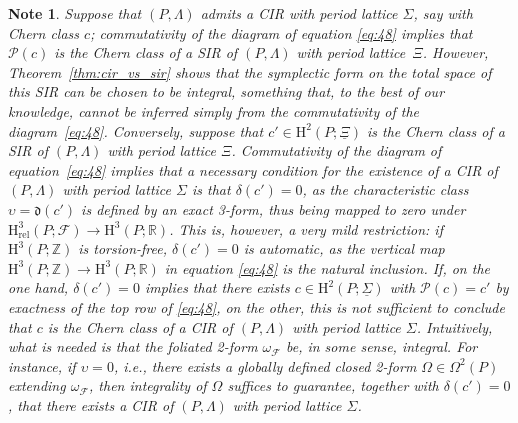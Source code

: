 \documentclass[10pt,a4paper]{amsart}
\numberwithin{equation}{section}
\newtheorem{Note}[Theorem]{Note}
\newcommand{\PM}{(P,\Lambda)} %
\newcommand{\HH}{\mathrm{H}}
\newcommand{\RR}{\mathbb{R}}
\newcommand{\ZZ}{\mathbb{Z}}
\begin{document}
\begin{Note}\label{obs:interpretation}
Suppose that $\PM$ admits a CIR with period lattice $\Sigma$, say with Chern class $c$; commutativity of the diagram of equation \eqref{eq:48} implies that $\mathcal{P}(c)$ is the Chern class of a SIR of $\PM$ with period lattice~$\Xi$. However, Theorem~\ref{thm:cir_vs_sir} shows that the symplectic form on the total space of this SIR can be chosen to be integral, something that, to the best of our knowledge, cannot be inferred simply from the commutativity of the diagram~\eqref{eq:48}. Conversely, suppose that $c' \in \HH^2(P;\underline{\Xi})$ is the Chern class of a SIR of $\PM$ with period lattice $\Xi$. Commutativity of the diagram of equation~\eqref{eq:48} implies that a necessary condition for the existence of a CIR of $\PM$ with period lattice $\Sigma$ is that $\delta(c') = 0$, as the characteristic class $\upsilon = \mathfrak{d}(c')$ is def\/ined by an exact 3-form, thus being mapped to zero under $\HH^3_{\mathrm{rel}}(P;\mathcal{F}) \to \HH^3(P;\RR)$. This is, however, a very mild restriction: if $\HH^3(P;\ZZ)$ is torsion-free, $\delta(c') =0$ is automatic, as the vertical map $\HH^3(P;\ZZ) \to \HH^3(P;\RR)$ in equation \eqref{eq:48} is the natural inclusion. If, on the one hand, $\delta(c') =0$ implies that there exists $c \in \HH^2(P;\underline{\Sigma})$ with $\mathcal{P}(c) = c'$ by exactness of the top row of \eqref{eq:48}, on the other, this is not suf\/f\/icient to conclude that $c$ is the Chern class of a CIR of $\PM$ with period lattice $\Sigma$. Intuitively, what is needed is that the foliated 2-form $\omega_{\mathcal{F}}$ be, in some sense, {\it integral}. For instance, if $\upsilon = 0$, i.e., there exists a globally def\/ined closed 2-form $\Omega \in \Omega^2(P)$ extending $\omega_{\mathcal{F}}$, then integrality of $\Omega$ suf\/f\/ices to guarantee, together with $\delta(c') = 0$, that there exists a CIR of $\PM$ with period lattice $\Sigma$.
\end{Note}
\end{document}
